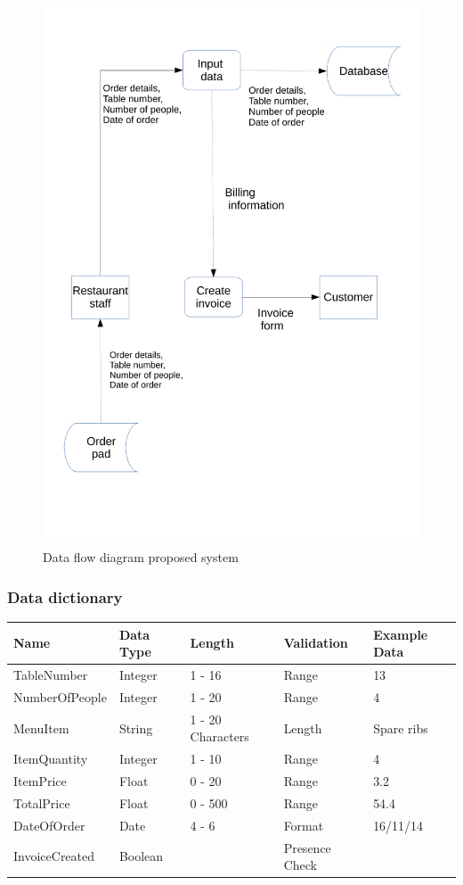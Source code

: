 \begin{figure}[H]
    \includegraphics[height = 16cm]{./Analysis/ProposeInvoice}
    \caption{Data flow diagram proposed system} \label{fig:Invoiceflow}
\end{figure}

\subsubsection{Data dictionary}

\begin{center}

\begin{tabular}{ | p{3cm}| p{1cm} | p{2cm} | p{2cm} | p{2cm} |  }
    \hline
    \textbf{Name} & \textbf{Data Type} & \textbf{Length} & \textbf{Validation} &\textbf{Example Data} \\ \hline
   TableNumber & Integer & 1 - 16 & Range  & 13\\ \hline
   NumberOfPeople & Integer & 1 - 20 & Range  & 4 \\ \hline
   MenuItem & String & 1 - 20 Characters & Length  & Spare ribs\\ \hline
   ItemQuantity & Integer & 1 - 10 & Range  & 4\\ \hline
   ItemPrice & Float & 0 - 20 & Range  &3.2\\ \hline
    TotalPrice & Float & 0 - 500 & Range  & 54.4\\ \hline
   DateOfOrder &Date & 4 - 6 & Format  & 16/11/14\\ \hline
    InvoiceCreated & Boolean &  & Presence Check  & \\ \hline


\end{tabular}
\label{tab:range_examples}
\end{center}


